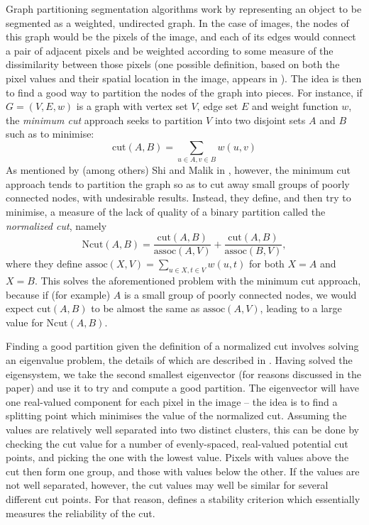 Graph partitioning segmentation algorithms work by representing an object to be segmented as a weighted, undirected graph. In the case of images, the nodes of this graph would be the pixels of the image, and each of its edges would connect a pair of adjacent pixels and be weighted according to some measure of the dissimilarity between those pixels (one possible definition, based on both the pixel values and their spatial location in the image, appears in \cite{shi00}). The idea is then to find a good way to partition the nodes of the graph into pieces. For instance, if $G = (V,E,w)$ is a graph with vertex set $V$, edge set $E$ and weight function $w$, the \emph{minimum cut} approach seeks to partition $V$ into two disjoint sets $A$ and $B$ such as to minimise:
%
\[
\mbox{cut}(A,B) = \sum_{u \in A, v \in B} w(u,v)
\]
%
As mentioned by (among others) Shi and Malik in \cite{shi00}, however, the minimum cut approach tends to partition the graph so as to cut away small groups of poorly connected nodes, with undesirable results. Instead, they define, and then try to minimise, a measure of the lack of quality of a binary partition called the \emph{normalized cut}, namely
%
\[
\mbox{Ncut}(A,B) = \frac{\mbox{cut}(A,B)}{\mbox{assoc}(A,V)} + \frac{\mbox{cut}(A,B)}{\mbox{assoc}(B,V)},
\]
%
where they define $\mbox{assoc}(X,V) = \sum_{u \in X, t \in V} w(u,t)$ for both $X = A$ and $X = B$. This solves the aforementioned problem with the minimum cut approach, because if (for example) $A$ is a small group of poorly connected nodes, we would expect $\mbox{cut}(A,B)$ to be almost the same as $\mbox{assoc}(A,V)$, leading to a large value for $\mbox{Ncut}(A,B)$.

Finding a good partition given the definition of a normalized cut involves solving an eigenvalue problem, the details of which are described in \cite{shi00}. Having solved the eigensystem, we take the second smallest eigenvector (for reasons discussed in the paper) and use it to try and compute a good partition. The eigenvector will have one real-valued component for each pixel in the image -- the idea is to find a splitting point which minimises the value of the normalized cut. Assuming the values are relatively well separated into two distinct clusters, this can be done by checking the cut value for a number of evenly-spaced, real-valued potential cut points, and picking the one with the lowest value. Pixels with values above the cut then form one group, and those with values below the other. If the values are not well separated, however, the cut values may well be similar for several different cut points. For that reason, \cite{shi00} defines a stability criterion which essentially measures the reliability of the cut.

